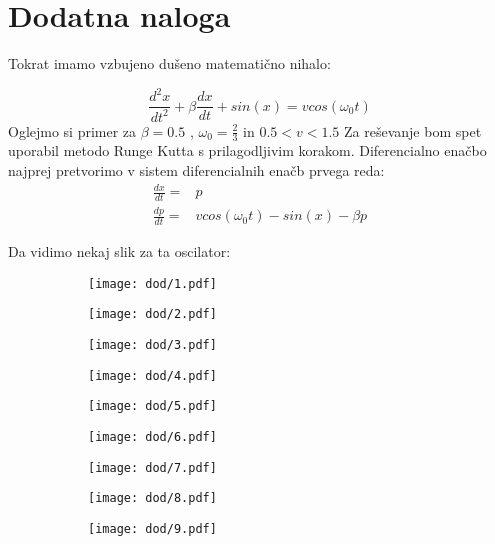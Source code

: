 \documentclass{article}
\begin{document}
\section{Dodatna naloga}

Tokrat imamo vzbujeno dušeno matematično nihalo:

\begin{equation*}
\frac{d^2x}{dt^2} + \beta \frac{dx}{dt} + sin(x) = v cos(\omega_0 t)
\end{equation*}
Oglejmo si primer za $\beta=0.5$ , $\omega_0 = \frac{2}{3}$ in $ 0.5 < v < 1.5$
Za reševanje bom spet uporabil metodo Runge Kutta s prilagodljivim korakom.
Diferencialno enačbo najprej pretvorimo v sistem diferencialnih enačb prvega reda:
\begin{align*}
\frac{dx}{dt} =& p \\
\frac{dp}{dt} =& v cos(\omega_0 t) - sin(x) - \beta p
\end{align*}

Da vidimo nekaj slik za ta oscilator:

\begin{figure}[H]
\begin{subfigure}{.3\textwidth}
\texttt{[image: dod/1.pdf]}
\end{subfigure}
\begin{subfigure}{.3\textwidth}
\texttt{[image: dod/2.pdf]}
\end{subfigure}
\begin{subfigure}{.3\textwidth}
\texttt{[image: dod/3.pdf]}
\end{subfigure}
\end{figure}

\begin{figure}[H]
\begin{subfigure}{.3\textwidth}
\texttt{[image: dod/4.pdf]}
\end{subfigure}
\begin{subfigure}{.3\textwidth}
\texttt{[image: dod/5.pdf]}
\end{subfigure}
\begin{subfigure}{.3\textwidth}
\texttt{[image: dod/6.pdf]}
\end{subfigure}
\end{figure}

\begin{figure}[H]
\begin{subfigure}{.3\textwidth}
\texttt{[image: dod/7.pdf]}
\end{subfigure}
\begin{subfigure}{.3\textwidth}
\texttt{[image: dod/8.pdf]}
\end{subfigure}
\begin{subfigure}{.3\textwidth}
\texttt{[image: dod/9.pdf]}
\end{subfigure}
\end{figure}
\end{document}
